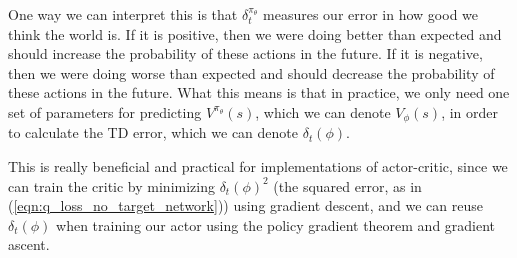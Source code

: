 \documentclass[journal, onecolumn, 12pt, draftclsnofoot]{IEEEtran}
\begin{document}
		\par One way we can interpret this is that $\delta_t^{\pi_\theta}$ measures our error in how good we think the world is. If it is positive, then we were doing better than expected and should increase the probability of these actions in the future. If it is negative, then we were doing worse than expected and should decrease the probability of these actions in the future. What this means is that in practice, we only need one set of parameters for predicting $V^{\pi_\theta}(s)$, which we can denote $V_\phi(s)$, in order to calculate the TD error, which we can denote $\delta_t(\phi)$.
		\par This is really beneficial and practical for implementations of actor-critic, since we can train the critic by minimizing $\delta_t(\phi)^2$ (the squared error, as in (\ref{eqn:q_loss_no_target_network})) using gradient descent, and we can reuse $\delta_t(\phi)$ when training our actor using the policy gradient theorem and gradient ascent.
\end{document}
